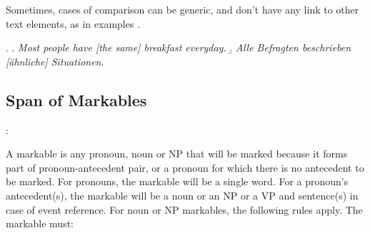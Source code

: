 \documentclass[a4paper]{article}
\begin{document}
Sometimes, cases of comparison can be generic, and don't have any link to other text elements, as in examples \Next[a-b].

\ex.
\a. {\sl Most people have [the same] breakfast everyday.}
\b. {\sl Alle Befragten beschrieben [ähnliche] Situationen}.


\subsection{Span of Markables}

\cite{GrishinaStedeGuide,GuillouEtAlGuide}:

A markable is any pronoun, noun or NP that will be marked because it forms part of pronoun-antecedent pair, or a pronoun for which there is no antecedent to be marked. For pronouns, the markable will be a single word. For a pronoun's antecedent(s), the markable will be a noun or an NP or a VP and sentence(s) in case of event reference. For noun or NP markables, the following rules apply. The markable must:
\end{document}

